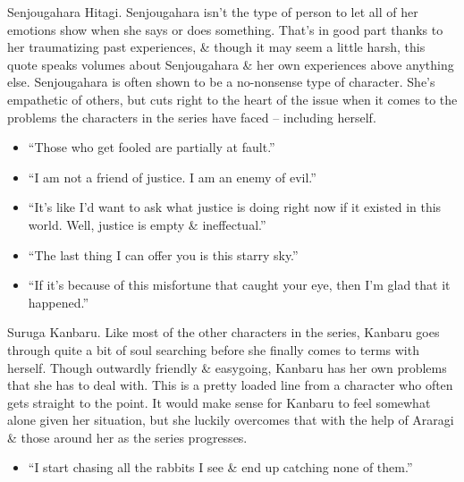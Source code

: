 \documentclass{article}
\begin{document}
\begin{enumerate}
\begin{itemize}
    \end{itemize}
    {\sf Senjougahara Hitagi.} Senjougahara isn't the type of person to let all of her emotions show when she says or does something. That's in good part thanks to her traumatizing past experiences, \& though it may seem a little harsh, this quote speaks volumes about Senjougahara \& her own experiences above anything else. Senjougahara is often shown to be a no-nonsense type of character. She's empathetic of others, but cuts right to the heart of the issue when it comes to the problems the characters in the series have faced -- including herself.
    \begin{itemize}
    	\item ``Those who get fooled are partially at fault.''
    	\item ``I am not a friend of justice. I am an enemy of evil.''
    	\item ``It's like I'd want to ask what justice is doing right now if it existed in this world. Well, justice is empty \& ineffectual.''
    	\item ``The last thing I can offer you is this starry sky.''
    	\item ``If it's because of this misfortune that caught your eye, then I'm glad that it happened.''
    \end{itemize}
    {\sf Suruga Kanbaru.} Like most of the other characters in the series, Kanbaru goes through quite a bit of soul searching before she finally comes to terms with herself. Though outwardly friendly \& easygoing, Kanbaru has her own problems that she has to deal with. This is a pretty loaded line from a character who often gets straight to the point. It would make sense for Kanbaru to feel somewhat alone given her situation, but she luckily overcomes that with the help of Araragi \& those around her as the series progresses.
    \begin{itemize}
    	\item ``I start chasing all the rabbits I see \& end up catching none of them.''

\end{itemize}
\end{enumerate}
\end{document}
